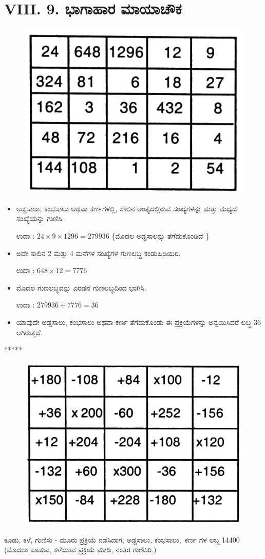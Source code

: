 \section*{VIII. 9. ಭಾಗಾಹಾರ ಮಾಯಾಚೌಕ}

\begin{figure}[H]
\includegraphics[scale=.8]{src/figures/chap7/fig7-31.jpg}
\end{figure}
\begin{itemize}
	\item ಅಡ್ಡಸಾಲು, ಕಂಭಸಾಲು ಅಥವಾ ಕರ್ಣಗಳಲ್ಲಿ, ಸಾಲಿನ ಅಂತ್ಯದಲ್ಲಿರುವ ಸಂಖ್ಯೆ\-ಗಳನ್ನು ಮತ್ತು ಮಧ್ಯದ ಸಂಖ್ಯೆಯನ್ನು ಗುಣಿಸಿ.

	ಉದಾ : $24 \times 9 \times 1296=279936$ \{ಮೊದಲ ಅಡ್ಡಸಾಲನ್ನು ತೆಗೆದು\-ಕೊಂಡಿದೆ \} 
	\item ಅದೇ ಸಾಲಿನ 2 ಮತ್ತು 4 ಮನೆಗಳ ಸಂಖ್ಯೆಗಳ ಗುಣಲಬ್ಧ ಕಂಡುಹಿಡಿಯಿರಿ.
	
	ಉದಾ : $648 \times 12=7776$
	\item ಮೊದಲ ಗುಣಲಬ್ಧವನ್ನು ಎರಡನೆ ಗುಣಲಬ್ಧದಿಂದ ಭಾಗಿಸಿ.

	ಉದಾ : $279936 \div 7776 = \boxed{36}$
	\item ಯಾವುದೇ ಅಡ್ಡಸಾಲು, ಕಂಭಸಾಲು ಅಥವಾ ಕರ್ಣ ತೆಗೆದುಕೊಂಡು ಈ ಪ್ರಕ್ರಿಯೆ\-ಗಳನ್ನು ಅನ್ವಯಿಸಿದರೆ ಲಬ್ಧ 36 ಆಗಿರುತ್ತದೆ.
\end{itemize}

\begin{center}
*****
\end{center}

\begin{figure}[H]
\includegraphics[scale=.8]{src/figures/chap7/fig7-32.jpg}
\end{figure}
ಕೂಡು, ಕಳೆ, ಗುಣಿಸು - ಮೂರು ಪ್ರಕ್ರಿಯೆ ನಡೆಸಿದಾಗ, ಅಡ್ಡಸಾಲು, \hbox{ಕಂಭಸಾಲು, ಕರ್ಣ} ಗಳ ಲಬ್ಧ 14400 (ಮೊದಲು ಕೂಡುವ, ಕಳೆಯುವ ಪ್ರಕ್ರಿಯೆ ಮಾಡಿ, ನಂತರ ಗುಣಿಸಿರಿ.)
